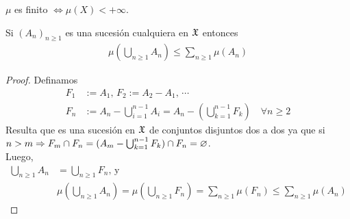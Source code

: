 \begin{corollary}
    $\mu$ es finito $\iff \mu(X) < +\infty$.
\end{corollary}

\begin{lemma}
    Si $(A_n)_{n \geq 1}$ es una sucesión cualquiera en $\mathfrak{X}$ entonces \begin{align*}
        \mu(\bigcup_{n \geq 1} A_n) \leq \sum_{n \geq 1} \mu(A_n)
    \end{align*}
    \begin{proof}
        Definamos \begin{align*}
            F_1 & := A_1 \text{, } F_2 := A_2 - A_1\text{, } \cdots                                                        \\
            F_n & := A_n - \bigcup_{i = 1}^{n-1} A_i = A_n - ( \bigcup_{k = 1}^{n-1} F_k ) \quad \forall n \geq 2
        \end{align*}
        Resulta que es una sucesión en $\mathfrak{X}$ de conjuntos disjuntos dos a dos ya que si $n > m \Rightarrow F_m \cap F_n = (A_m - \bigcup_{k = 1}^{n-1} F_k) \cap F_n = \varnothing$. \\
        Luego, \begin{align*}
            \bigcup_{n \geq 1} A_n & = \bigcup_{n \geq 1} F_n \text{, y }                                                                               \\
                                   & \mu(\bigcup_{n \geq 1} A_n) = \mu(\bigcup_{n \geq 1} F_n) = \sum_{n \geq 1} \mu(F_n) \leq \sum_{n \geq 1} \mu(A_n)
        \end{align*}
    \end{proof}
\end{lemma}

\clearpage

